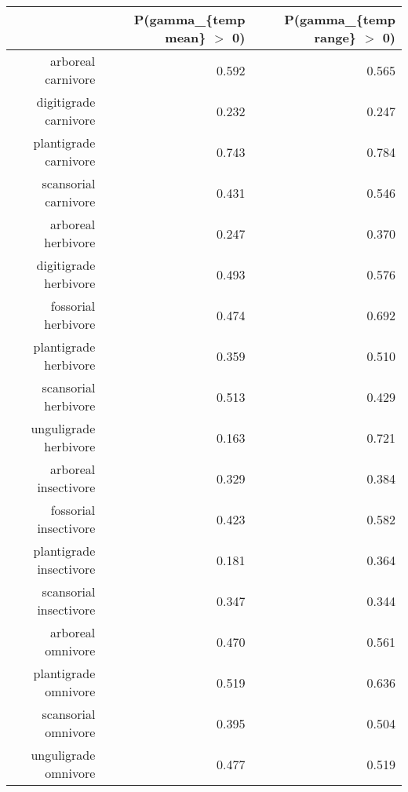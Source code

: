 \begin{table}[ht]
\centering
\begin{tabular}{rrr}
  \hline
 & P(gamma\_\{temp mean\} $>$ 0) & P(gamma\_\{temp range\} $>$ 0) \\ 
  \hline
arboreal carnivore & 0.592 & 0.565 \\ 
  digitigrade carnivore & 0.232 & 0.247 \\ 
  plantigrade carnivore & 0.743 & 0.784 \\ 
  scansorial carnivore & 0.431 & 0.546 \\ 
  arboreal herbivore & 0.247 & 0.370 \\ 
  digitigrade herbivore & 0.493 & 0.576 \\ 
  fossorial herbivore & 0.474 & 0.692 \\ 
  plantigrade herbivore & 0.359 & 0.510 \\ 
  scansorial herbivore & 0.513 & 0.429 \\ 
  unguligrade herbivore & 0.163 & 0.721 \\ 
  arboreal insectivore & 0.329 & 0.384 \\ 
  fossorial insectivore & 0.423 & 0.582 \\ 
  plantigrade insectivore & 0.181 & 0.364 \\ 
  scansorial insectivore & 0.347 & 0.344 \\ 
  arboreal omnivore & 0.470 & 0.561 \\ 
  plantigrade omnivore & 0.519 & 0.636 \\ 
  scansorial omnivore & 0.395 & 0.504 \\ 
  unguligrade omnivore & 0.477 & 0.519 \\ 
   \hline
\end{tabular}
\label{tab:surv_temp}
\end{table}
